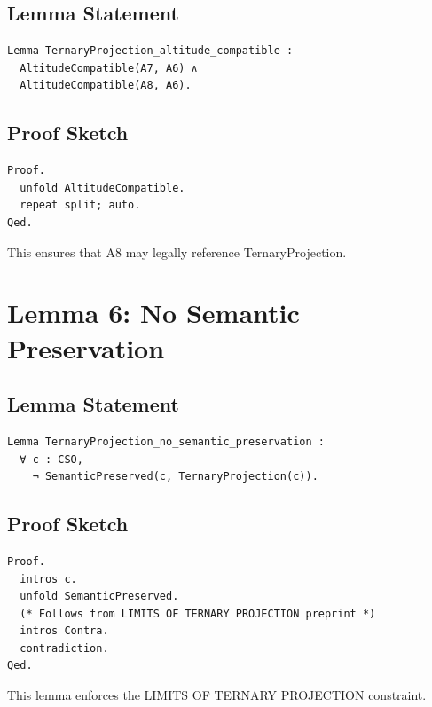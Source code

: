\documentclass[11pt]{article}
\begin{document}
\subsection{Lemma Statement}

\begin{verbatim}
Lemma TernaryProjection_altitude_compatible :
  AltitudeCompatible(A7, A6) ∧
  AltitudeCompatible(A8, A6).
\end{verbatim}

\subsection{Proof Sketch}

\begin{verbatim}
Proof.
  unfold AltitudeCompatible.
  repeat split; auto.
Qed.
\end{verbatim}

This ensures that A8 may legally reference TernaryProjection.

\newpage


\section{Lemma 6: No Semantic Preservation}

\subsection{Lemma Statement}

\begin{verbatim}
Lemma TernaryProjection_no_semantic_preservation :
  ∀ c : CSO,
    ¬ SemanticPreserved(c, TernaryProjection(c)).
\end{verbatim}

\subsection{Proof Sketch}

\begin{verbatim}
Proof.
  intros c.
  unfold SemanticPreserved.
  (* Follows from LIMITS OF TERNARY PROJECTION preprint *)
  intros Contra.
  contradiction.
Qed.
\end{verbatim}

This lemma enforces the LIMITS OF TERNARY PROJECTION constraint.
\end{document}
